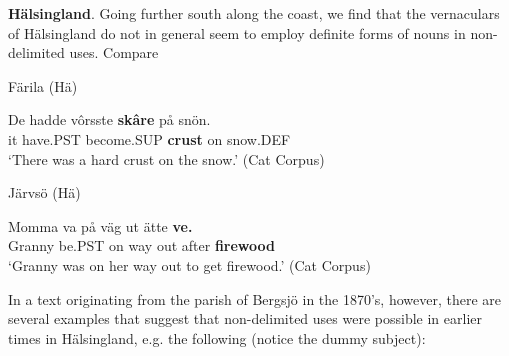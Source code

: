 \textbf{Hälsingland}. Going further south along the coast, we find that the vernaculars of Hälsingland do not in general seem to employ definite forms of nouns in non-delimited uses. Compare 


\item 

Färila (Hä)



 \ea\label{}
\gll De  hadde  vôrsste  \textbf{skâre} på  snön.\\


it  have.PST  become.SUP  \textbf{crust} on  snow.DEF\\

\glt ‘There was a hard crust on the snow.’ (Cat Corpus)

\z

\item 

Järvsö (Hä)



 \ea\label{}
\gll Momma  va  på  väg  ut  ätte  \textbf{ve.}\\


Granny  be.PST  on  way  out  after  \textbf{firewood}\\

\glt ‘Granny was on her way out to get firewood.’ (Cat Corpus)

\z

In a text originating from the parish of Bergsjö in the 1870’s, however, there are several examples that suggest that non-delimited uses were possible in earlier times in Hälsingland, e.g. the following (notice the dummy subject):


